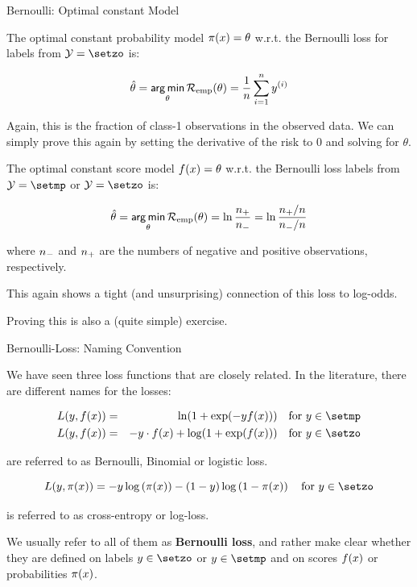 \begin{vbframe}{Bernoulli: Optimal constant Model}

The optimal constant probability model $\pi(x) = \theta$ w.r.t. the Bernoulli loss for labels from $\Yspace = \setzo$ is:

\begin{eqnarray*}
  \hat{\theta} = \mathop{\sf arg\,min}_{\theta} \mathcal{R}_{\text{emp}}(\theta) = \frac{1}{n} \sum_{i=1}^n y^{(i)}
\end{eqnarray*}

Again, this is the fraction of class-1 observations in the observed data.
We can simply prove this again by setting the derivative of the risk to 0 and solving for $\theta$.

\framebreak

The optimal constant score model $f(x) = \theta$ w.r.t. the Bernoulli loss labels from $\Yspace = \setmp$ or $\Yspace = \setzo$ is:

\begin{eqnarray*}
  \hat{\theta} = \mathop{\sf arg\,min}_{\theta} \mathcal{R}_{\text{emp}}(\theta) = \ln \frac{n_{+}}{n_{-}} = \ln \frac{n_{+} / n}{n_{-} /n} 
\end{eqnarray*}

where $n_{-}$ and $n_{+}$ are the numbers of negative and positive observations, respectively.

\lz

This again shows a tight (and unsurprising) connection of this loss to log-odds.

\lz

Proving this is also a (quite simple) exercise.

\end{vbframe}

\begin{vbframe}{Bernoulli-Loss: Naming Convention}

We have seen three loss functions that are closely related. In the literature, there are different names for the losses: 

\begin{eqnarray*}
  L(y, \fx) &=& \ln(1+\exp(-y\fx)) \quad \text{for } y \in \setmp \\
  L(y, \fx) &=& - y \cdot \fx + \log(1 + \exp(\fx)) \quad \text{for } y \in \setzo 
\end{eqnarray*}

are referred to as Bernoulli, Binomial or logistic loss. 

  $$
    L(y, \pix) = - y \log \left(\pix\right) - (1 - y) \log \left(1 - \pix\right) \quad \text{for } y \in \setzo
  $$

is referred to as cross-entropy or log-loss. 

\lz 

We usually refer to all of them as \textbf{Bernoulli loss}, and rather make clear whether they are defined on labels $y \in \setzo$ or $y \in \setmp$ and on scores $f(x)$ or probabilities $\pi(x)$. 

\end{vbframe}




